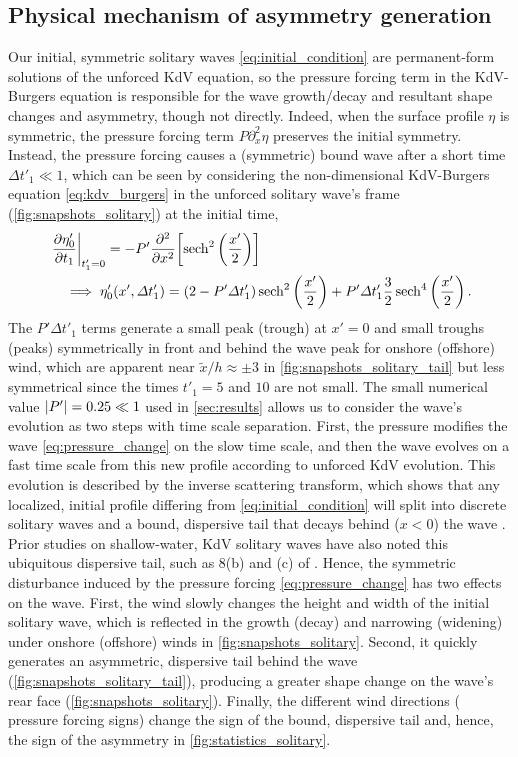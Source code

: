 \documentclass{jfm}
\begin{document}
\subsection{\label{sec:physical_reason} Physical mechanism of asymmetry
generation}
Our initial, symmetric solitary waves \cref{eq:initial_condition} are
permanent-form solutions of the unforced KdV equation, so the pressure
forcing term in the KdV-Burgers equation is responsible for the wave
growth/decay and resultant shape changes and asymmetry, though not
directly.
Indeed, when the surface profile $\eta$ is symmetric, the pressure
forcing term $P \partial_x^2 \eta$ preserves the initial symmetry.
Instead, the pressure forcing causes a (symmetric) bound wave after a
short time $\Delta t'_1 \ll 1$, which can be seen by considering the
non-dimensional KdV-Burgers equation \cref{eq:kdv_burgers} in the
unforced solitary wave's frame (\cref{fig:snapshots_solitary}) at the
initial time,
\begin{align}
  &\eval{\pdv{\eta'_0}{t_1}}_{t'_1=0} = -P' \pdv[2]{x} \bqty{
  \sech^2\pqty{\frac{x'}{2}}}
  \\
  &\quad \implies \eta'_0(x', \Delta t'_1) =
  (2-P'\Delta t'_1) \sech^2\pqty{\frac{x'}{2}}
  +
  P' \Delta t'_1 \frac{3}{2}\sech^4\pqty{\frac{x'}{2}}
  \,.
  \label{eq:pressure_change}
\end{align}
The $P'\Delta t'_1$ terms generate a small peak (trough) at $x'=0$ and
small troughs (peaks) symmetrically in front and behind the wave peak
for onshore (offshore) wind, which are apparent near $\tilde{x}/h
\approx \pm 3$ in \cref{fig:snapshots_solitary_tail} but less
symmetrical since the times $t'_1 = 5$ and $10$ are not small.
The small numerical value $\abs{P'} = 0.25 \ll 1$ used in
\cref{sec:results} allows us to consider the wave's evolution as two
steps with time scale separation.
First, the pressure modifies the wave \cref{eq:pressure_change} on the
slow time scale, and then the wave evolves on a fast time scale from
this new profile according to unforced KdV evolution.
This evolution is described by the inverse scattering transform, which
shows that any localized, initial profile differing from
\cref{eq:initial_condition} will split into discrete solitary waves and
a bound, dispersive tail that decays behind ($x<0$) the wave
\citep[\eg][]{mei2005nonlinear}.
Prior studies on shallow-water, KdV solitary waves have also noted this
ubiquitous dispersive tail, such as \figsname{} 8(b) and (c) of
\citet{hammack1974korteweg}.
Hence, the symmetric disturbance induced by the pressure forcing
\cref{eq:pressure_change} has two effects on the wave.
First, the wind slowly changes the height and width of the initial
solitary wave, which is reflected in the growth (decay) and narrowing
(widening) under onshore (offshore) winds in
\cref{fig:snapshots_solitary}.
Second, it quickly generates an asymmetric, dispersive tail behind the
wave (\cref{fig:snapshots_solitary_tail}), producing a greater shape
change on the wave's rear face (\cref{fig:snapshots_solitary}).
Finally, the different wind directions (\ie{} pressure forcing signs)
change the sign of the bound, dispersive tail and, hence, the sign of
the asymmetry in \cref{fig:statistics_solitary}.
\end{document}
